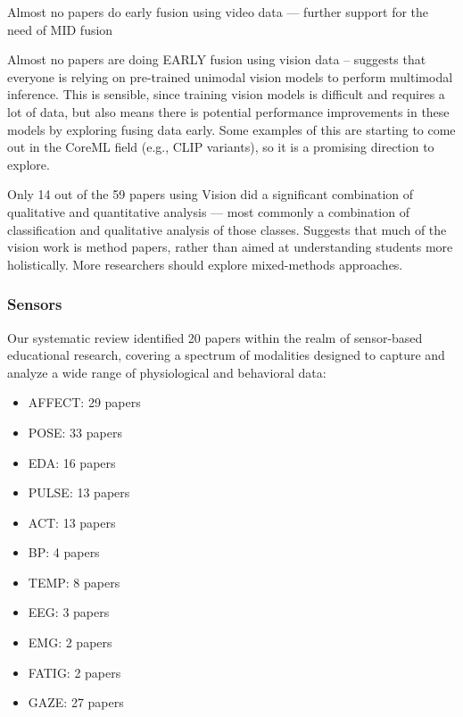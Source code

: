 \documentclass[manuscript,screen,review]{acmart}
\begin{document}
Almost no papers do early fusion using video data --- further support for the need of MID fusion

Almost no papers are doing EARLY fusion using vision data -- suggests that everyone is relying on pre-trained unimodal vision models to perform multimodal inference. This is sensible, since training vision models is difficult and requires a lot of data, but also means there is potential performance improvements in these models by exploring fusing data early. Some examples of this are starting to come out in the CoreML field (e.g., CLIP variants), so it is a promising direction to explore.

Only 14 out of the 59 papers using Vision did a significant combination of qualitative and quantitative analysis --- most commonly a combination of classification and qualitative analysis of those classes. Suggests that much of the vision work is method papers, rather than aimed at understanding students more holistically. More researchers should explore mixed-methods approaches. 

\subsubsection{Sensors}


Our systematic review identified 20 papers within the realm of sensor-based educational research, covering a spectrum of modalities designed to capture and analyze a wide range of physiological and behavioral data:

\begin{itemize}
    \item AFFECT: 29 papers
    \item POSE: 33 papers
    \item EDA: 16 papers
    \item PULSE: 13 papers
    \item ACT: 13 papers
    \item BP: 4 papers
    \item TEMP: 8 papers
    \item EEG: 3 papers
    \item EMG: 2 papers
    \item FATIG: 2 papers
    \item GAZE: 27 papers
\end{itemize}
\end{document}
